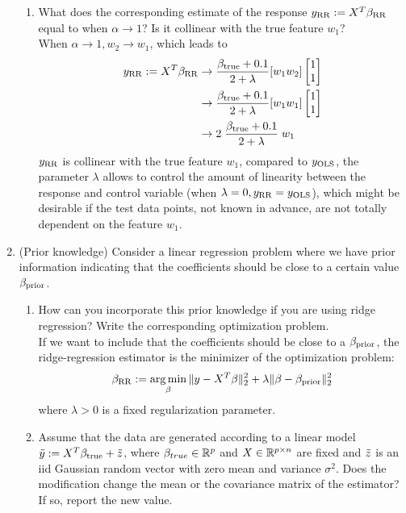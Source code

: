 \documentclass[12pt,twoside]{article}
\begin{document}
\begin{enumerate}
\begin{enumerate}
  \item  What does the corresponding estimate of the response $y_{\operatorname{RR}} := X^T\beta_{\operatorname{RR}}$ equal to when $\alpha \rightarrow 1$? Is it collinear with the true feature $w_1$?\\
  \medskip
  When  $\alpha \rightarrow 1, w_2 \rightarrow w_1$, which leads to
 \begin{align*}
 	y_{\operatorname{RR}} := X^T\beta_{\operatorname{RR}}	&\rightarrow	\frac{ \beta_{\operatorname{true}} + 0.1}{ 2 + \lambda} [w_1 w_2]  \begin{bmatrix} 1  \\ 1 \end{bmatrix} \\
								&\rightarrow 	\frac{ \beta_{\operatorname{true}} + 0.1}{ 2 + \lambda} [w_1 w_1] \begin{bmatrix} 1  \\ 1 \end{bmatrix} \\
								&\rightarrow 	2 \;  \frac{\beta_{\operatorname{true}} + 0.1}{ 2 + \lambda} \; w_1
 \end{align*}    
  $y_{\operatorname{RR}}$ is collinear with the true feature $w_1$, compared to $y_{\operatorname{OLS}}$, the parameter $\lambda$ allows to control the amount of linearity between the response and control variable (when $\lambda=0, y_{\operatorname{RR}} = y_{\operatorname{OLS}}$), which might be desirable if the test data points, not known in advance, are not totally dependent on the feature $w_1$.
  
  \end{enumerate} 
 
 \newpage
 
 \item (Prior knowledge) Consider a linear regression problem where we have prior information indicating that the coefficients should be close to a certain value $\beta_{\operatorname{prior}}$. 
 \begin{enumerate}
   \item How can you incorporate this prior knowledge if you are using ridge regression? Write the corresponding optimization problem.\\
 
  \medskip
   If we want to include that the coefficients should be close to a  $\beta_{\operatorname{prior}}$, the ridge-regression estimator is the minimizer of the optimization problem:
   $$\beta_{\operatorname{RR}} := \operatorname*{arg\,min}_\beta \| y - X^T \beta \|_2^2 + \lambda \| \beta - \beta_{\operatorname{prior}} \|_2^2$$
   where $\lambda > 0$ is a fixed regularization parameter.
   
   \item Assume that the data are generated according to a linear model $\tilde{ y }:= X^T \beta_{\operatorname{true}} + \tilde{ z }$, where $\beta_{true}\in \mathbb{R}^{p}$ and $X  \in \mathbb{R}^{p \times n}$ are fixed and $\tilde{ z }$ is an iid Gaussian random vector with zero mean and variance $\sigma^2$. Does the modification change the mean or the covariance matrix of the estimator? If so, report the new value.\\
   

\end{enumerate}
\end{enumerate}
\end{document}
